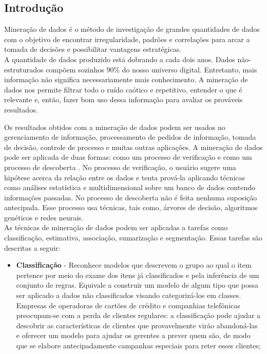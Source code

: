 \documentclass[a4paper, 12pt]{article}\usepackage[]{graphicx}\usepackage[]{color}
\begin{document}
	\begin{multicols}{2}
		\section{Introdução}
		Mineração de dados é o método de investigação de grandes quantidades de dados com o objetivo de encontrar irregularidade, padrões e correlações para arcar a tomada de decisões e possibilitar vantagens estratégicas\cite{intro1}.\\
		
		A quantidade de dados produzido está dobrando a cada dois anos. Dados não-estruturados compõem sozinhos 90\% do nosso universo digital. Entretanto, mais informação não significa necessariamente mais conhecimento. A mineração de dados nos permite filtrar todo o ruído caótico e repetitivo, entender o que é relevante e, então, fazer bom uso dessa informação para avaliar os prováveis resultados.
		
		Os resultados obtidos com a mineração de dados podem ser usados no gerenciamento de informação, processamento de pedidos de informação, tomada de decisão, controle de processo e muitas outras aplicações. A mineração de dados pode ser aplicada de duas formas: como um processo de verificação e como um processo de descoberta . No processo de verificação, o usuário sugere uma hipótese acerca da relação entre os dados e tenta prová-la aplicando técnicas como análises estatística e multidimensional sobre um banco de dados contendo informações passadas. No processo de descoberta não é feita nenhuma suposição antecipada. Esse processo usa técnicas, tais como, árvores de decisão, algoritmos genéticos e redes neurais.\\
		
		As técnicas de mineração de dados podem ser aplicadas a tarefas como classificação, estimativa, associação, sumarização e segmentação. Essas tarefas são descritas a seguir\cite{intro2}:
		\begin{itemize}
			\item \textbf{Classificação} - Reconhece modelos que descrevem o grupo ao qual o item pertence por meio do exame dos itens já classificados e pela inferência de um conjunto de regras. Equivale  a construir um modelo de algum tipo que possa ser aplicado a dados não classificados visando categorizá-los em classes.  Empresas de operadoras de cartões de crédito e companhias telefônicas preocupam-se com a perda de clientes regulares: a classificação pode ajudar a descobrir as características de clientes que provavelmente virão abandoná-las e oferecer um modelo para ajudar os gerentes a prever quem são, de modo que se elabore antecipadamente campanhas especiais para reter esses clientes;
			

\end{itemize}
\end{multicols}
\end{document}
